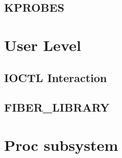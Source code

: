\documentclass[a4paper]{article}
\begin{document}
\subsection*{KPROBES}

\section{User Level}
\subsection*{IOCTL Interaction}
\subsection*{FIBER\_LIBRARY}

\section{Proc subsystem}
\end{document}
